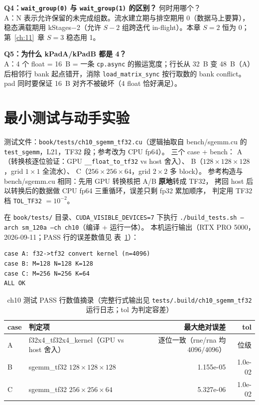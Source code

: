 \textbf{Q4：\texttt{wait\_\allowbreak{}group\allowbreak{}(0)} 与 \texttt{wait\_\allowbreak{}group\allowbreak{}(1)} 的区别？}
何时用哪个？\\
A：N 表示允许保留的未完成组数。流水建立期与排空期用 0（数据马上要算），
稳态满载期用 kStages$-$2（允许 $S{-}2$ 组跨迭代 in-flight）。本章
$S{=}2$ 恒为 0；第~\ref{ch:11}~章 $S{=}3$ 稳态用 1。

\textbf{Q5：为什么 kPadA/kPadB 都是 4？}\\
A：4 个 float = 16~B = 一条 \texttt{cp.async} 的搬运宽度；行长从 32~B 变
48~B（A）后相邻行 bank 起点错开，消除 \texttt{load\_\allowbreak{}matrix\_\allowbreak{}sync} 按行取数的
bank conflict。pad 同时要保证 16~B 对齐不被破坏（4 float 恰好满足）。

\section{最小测试与动手实验}

测试文件：\texttt{book/\allowbreak{}tests/\allowbreak{}ch10\_\allowbreak{}sgemm\_\allowbreak{}tf32.cu}（逻辑抽取自
bench/sgemm.cu 的 \texttt{test\_sgemm}，L21，TF32 段；参考改为 CPU fp64）。
三个 case + bench：
A（转换核逐位验证：GPU \texttt{\_\allowbreak{}\_\allowbreak{}float\_\allowbreak{}to\_\allowbreak{}tf32} vs host 舍入）、
B（$128\times128\times128$，grid $1\times1$ 全流水）、
C（$256\times256\times64$，grid $2\times2$ 多 block）。
参考构造与 bench/sgemm.cu 相同：先用 GPU 转换核把 A/B \textbf{原地}转成 TF32，
拷回 host 后以转换后的数据做 CPU fp64 三重循环，误差只剩 fp32 累加顺序，
判定用 TF32 档 \texttt{TOL\_TF32} $= 10^{-2}$。

在 \texttt{book/tests/} 目录、\texttt{CUDA\_\allowbreak{}VISIBLE\_\allowbreak{}DEVICES=\allowbreak{}7} 下执行
\texttt{.\allowbreak{}/\allowbreak{}build\_\allowbreak{}tests.\allowbreak{}sh --arch sm\_\allowbreak{}120a --ch ch10}（编译 + 运行一体）。
本机运行输出（RTX PRO 5000，2026-09-11；PASS 行的误差数值见
表~\ref{tab:10-pass}）：

\begin{lstlisting}[style=console]
case A: f32->tf32 convert kernel (n=4096)
case B: M=128 N=128 K=128
case C: M=256 N=256 K=64
ALL OK
\end{lstlisting}

\begin{table}[htbp]
\centering
\caption{ch10 测试 PASS 行数值摘录（完整行式输出见
\texttt{tests/\allowbreak{}.build/\allowbreak{}ch10\_\allowbreak{}sgemm\_\allowbreak{}tf32} 运行日志；tol 为判定容差）}
\label{tab:10-pass}
\begin{tabular}{llrr}
\toprule
case & 判定项 & 最大绝对误差 & tol \\
\midrule
A & f32x4\_tf32x4\_kernel（GPU vs host 舍入） & 逐位一致（rne/rna 均 $4096/4096$） & 位级 \\
B & sgemm\_tf32 $128\times128\times128$ & 1.155e-05 & 1.0e-02 \\
C & sgemm\_tf32 $256\times256\times64$  & 5.327e-06 & 1.0e-02 \\
\bottomrule
\end{tabular}
\end{table}

